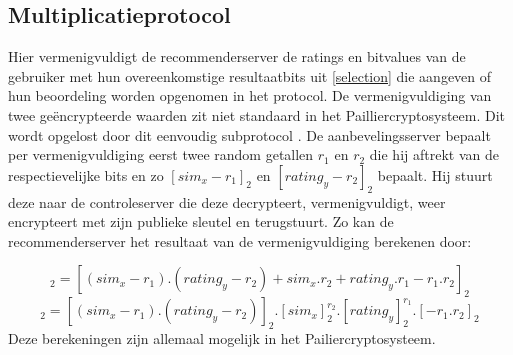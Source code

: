 \subsection{Multiplicatieprotocol}
\label{multiplication} 
Hier vermenigvuldigt de recommenderserver de ratings en bitvalues van de gebruiker met hun overeenkomstige resultaatbits uit \ref{selection} die aangeven of hun beoordeling worden opgenomen in het protocol. De vermenigvuldiging van twee ge\"encrypteerde waarden zit niet standaard in het Pailliercryptosysteem. Dit wordt opgelost door dit eenvoudig subprotocol \cite{erkin:generating}. De aanbevelingsserver bepaalt per vermenigvuldiging eerst twee random getallen $r_1$ en $r_2$ die hij aftrekt van de respectievelijke bits en zo $[sim_x - r_1]_2$ en $[rating_y - r_2]_2$ bepaalt. Hij stuurt deze naar de controleserver die deze decrypteert, vermenigvuldigt, weer encrypteert met zijn publieke sleutel en terugstuurt. Zo kan de recommenderserver het resultaat van de vermenigvuldiging berekenen door:

\begin{equation}
[sim_x.rating_y]_2=[(sim_x-r_1).(rating_y-r_2) + sim_x.r_2 + rating_y.r_1 - r_1.r_2]_2
\end{equation}
\begin{equation}
[sim_x.rating_y]_2= [(sim_x-r_1).(rating_y-r_2)]_2 . [sim_x]_2^{r_2} . [rating_y]_2^{r_1}.[-r_1.r_2]_2
\end{equation}
Deze berekeningen zijn allemaal mogelijk in het Pailiercryptosysteem.
